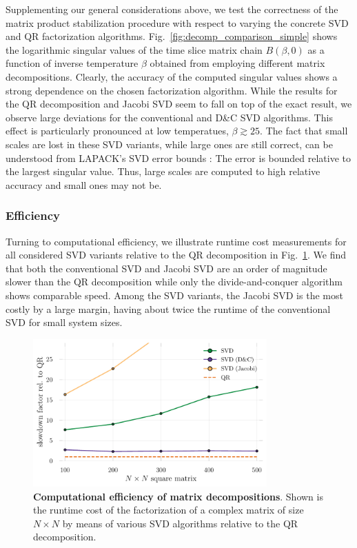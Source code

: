 \documentclass[submission, Phys]{SciPost}
\begin{document}
Supplementing our general considerations above, we test the correctness of the matrix product stabilization procedure with respect to varying the concrete SVD and QR factorization algorithms. Fig.~\ref{fig:decomp_comparison_simple} shows the logarithmic singular values of the time slice matrix chain $B(\beta, 0)$ as a function of inverse temperature $\beta$ obtained from employing different matrix decompositions. Clearly, the accuracy of the computed singular values shows a strong dependence on the chosen factorization algorithm. While the results for the QR decomposition and Jacobi SVD seem to fall on top of the exact result, we observe large deviations for the conventional and D\&C SVD algorithms. This effect is particularly pronounced at low temperatues, $\beta \gtrsim 25$. The fact that small scales are lost in these SVD variants, while large ones are still correct, can be understood from LAPACK's SVD error bounds \cite{errorbounds}: The error is bounded relative to the largest singular value. Thus, large scales are computed to high relative accuracy and small ones may not be.

\subsubsection{Efficiency}
Turning to computational efficiency, we illustrate runtime cost measurements for all considered SVD variants relative to the QR decomposition in Fig.~\ref{fig:benchmark_decomps}. We find that both the conventional SVD and Jacobi SVD are an order of magnitude slower than the QR decomposition while only the divide-and-conquer algorithm shows comparable speed. Among the SVD variants, the Jacobi SVD is the most costly by a large margin, having about twice the runtime of the conventional SVD for small system sizes.

\begin{figure}
	\centering
	\includegraphics[width=0.8\textwidth]{figures/benchmark_decomps.pdf}
	\caption{\textbf{Computational efficiency of matrix decompositions}. Shown is the runtime cost of the factorization of a complex matrix of size $N \times N$ by means of various SVD algorithms relative to the QR decomposition. \label{fig:benchmark_decomps}}
\end{figure}
\end{document}
